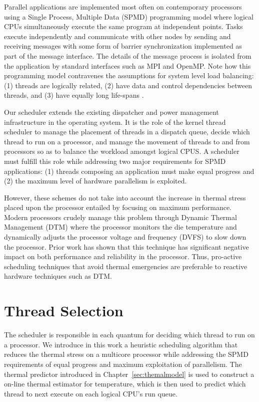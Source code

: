 Parallel applications are implemented most often on contemporary
processors using a Single Process, Multiple Data (SPMD) programming
model where logical CPUs simultaneously execute the same program at
independent points.  Tasks execute independently and communicate with
other nodes by sending and receiving messages with some form of barrier
synchronization implemented as part of the message interface.  The
details of the message process is isolated from the application by
standard interfaces such as MPI and OpenMP. %
Note how this programming model contravenes the assumptions for system
level load balancing: (1) threads are logically related, (2) have data
and control dependencies between threads, and (3) have equally long
life-spans \cite{Hofmeyr2010}.  

Our scheduler extends the existing dispatcher and power
management infrastructure in the operating system. It is the role of the
kernel thread scheduler to manage the placement of threads in a dispatch
queue, decide which thread to run on a processor, and manage the
movement of threads to and from processors so as to balance the workload
amongst logical CPUS.  A scheduler must fulfill this role while
addressing two major requirements for SPMD applications: (1) threads
composing an application must make equal progress and (2) the maximum
level of hardware parallelism is exploited.

However, these schemes do not take into account the increase in thermal
stress placed upon the processor entailed by focusing on maximum
performance.  Modern processors crudely manage this problem through Dynamic
Thermal Management (DTM) where the processor monitors the die
temperature and dynamically adjusts the processor voltage and frequency
(DVFS) to slow down the processor.  Prior work
\cite{Bircher2008,Donald2006,Coskun2008d} has shown that this technique has
significant negative impact on both performance and reliability in the
processor.   Thus, pro-active scheduling techniques that avoid thermal
emergencies are preferable to reactive hardware techniques such as DTM.

\section{Thread Selection}
\label{sec:whatnext}
The scheduler is responsible in each quantum for deciding which thread
to run on a processor.  We introduce in this work a heuristic scheduling
algorithm that reduces the thermal stress on a multicore processor
while addressing the SPMD requirements of equal progress and maximum
exploitation of parallelism.  The thermal predictor introduced in
Chapter~\ref{sec:themalmodel} is used to construct a on-line thermal
estimator for temperature, which is then used to predict which thread to
next execute on each logical CPU's run queue.

